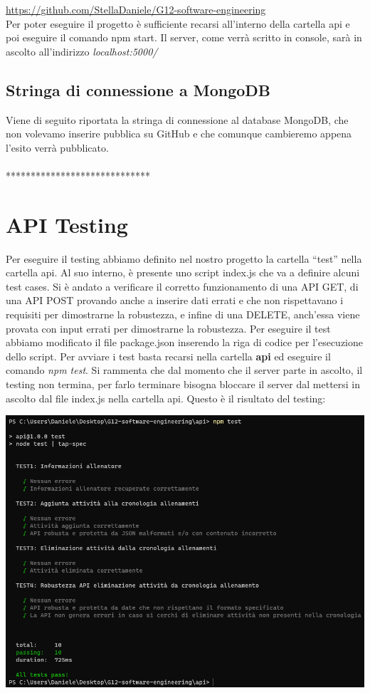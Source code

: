 \documentclass{article}
\begin{document}
   \href{https://github.com/StellaDaniele/G12-software-engineering}{https://github.com/StellaDaniele/G12-software-engineering}\\

   Per poter eseguire il progetto è sufficiente recarsi all’interno della cartella api e poi eseguire il comando npm start. Il server, come verrà scritto in console, sarà in ascolto all’indirizzo \textit{localhost:5000/}
   \subsection{Stringa di connessione a MongoDB}
   Viene di seguito riportata la stringa di connessione al database MongoDB, che non volevamo inserire pubblica su GitHub e che comunque cambieremo appena l’esito verrà pubblicato.\\
   \\
   *****************************
   \section{API Testing}
   Per eseguire il testing abbiamo definito nel nostro progetto la cartella “test” nella cartella api. Al suo interno, è presente uno script index.js che va a definire alcuni test cases. Si è andato a verificare il corretto funzionamento di una API GET, di una API POST provando anche a inserire dati errati e che non rispettavano i requisiti per dimostrarne la robustezza, e infine di una DELETE, anch’essa viene provata con input errati per dimostrarne la robustezza.
   Per eseguire il test abbiamo modificato il file package.json inserendo la riga di codice per l’esecuzione dello script. Per avviare i test basta recarsi nella cartella \textbf{api} ed eseguire il comando \textit{npm test}. Si rammenta che dal momento che il server parte in ascolto, il testing non termina, per farlo terminare bisogna bloccare il server dal mettersi in ascolto dal file index.js nella cartella api.
   Questo è il risultato del testing:\\
   \begin{center}
      \includegraphics[scale=0.5]{testing API.png}
   \end{center}
\end{document}
